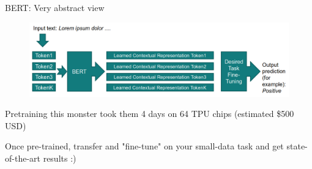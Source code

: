 \documentclass[12pt,aspectratio=169,handout]{beamer}
\begin{document}
\begin{frame}{BERT: Very abstract view}
	
	\begin{figure}
		\includegraphics[width=\linewidth]{img/bert1.png}
	\end{figure}	
	
	Pretraining this monster took them 4 days on 64 TPU chips
	(estimated \$500 USD)
	
	\bigskip
	
	Once pre-trained, transfer and "fine-tune" on your small-data task and get state-of-the-art results :)
	
	
\end{frame}
\end{document}
